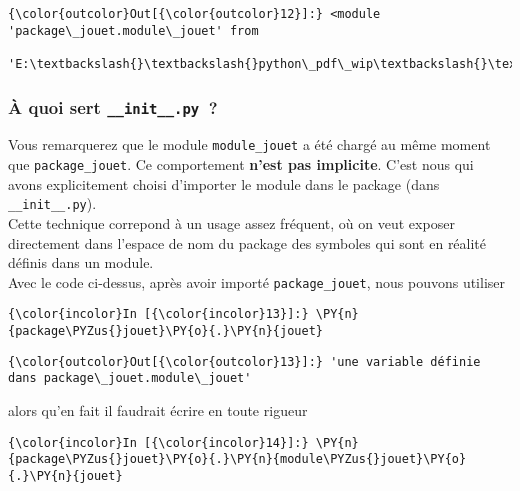 \begin{Verbatim}[commandchars=\\\{\}]
{\color{outcolor}Out[{\color{outcolor}12}]:} <module 'package\_jouet.module\_jouet' from
         'E:\textbackslash{}\textbackslash{}python\_pdf\_wip\textbackslash{}\textbackslash{}flotpython\textbackslash{}\textbackslash{}w5\textbackslash{}\textbackslash{}package\_jouet\textbackslash{}\textbackslash{}module\_jouet.py'>
\end{Verbatim}
            
    \hypertarget{uxe0-quoi-sert-__init__.py}{%
\subsubsection{\texorpdfstring{À quoi sert
\texttt{\_\_init\_\_.py}~?}{À quoi sert \_\_init\_\_.py~?}}\label{uxe0-quoi-sert-__init__.py}}

    Vous remarquerez que le module \texttt{module\_jouet} a été chargé au
même moment que \texttt{package\_jouet}. Ce comportement \textbf{n'est
pas implicite}. C'est nous qui avons explicitement choisi d'importer le
module dans le package (dans \texttt{\_\_init\_\_.py}).\\

    Cette technique correpond à un usage assez fréquent, où on veut exposer
directement dans l'espace de nom du package des symboles qui sont en
réalité définis dans un module.\\

Avec le code ci-dessus, après avoir importé \texttt{package\_jouet},
nous pouvons utiliser

    \begin{Verbatim}[commandchars=\\\{\}]
{\color{incolor}In [{\color{incolor}13}]:} \PY{n}{package\PYZus{}jouet}\PY{o}{.}\PY{n}{jouet}
\end{Verbatim}


\begin{Verbatim}[commandchars=\\\{\}]
{\color{outcolor}Out[{\color{outcolor}13}]:} 'une variable définie dans package\_jouet.module\_jouet'
\end{Verbatim}
            
    alors qu'en fait il faudrait écrire en toute rigueur

    \begin{Verbatim}[commandchars=\\\{\}]
{\color{incolor}In [{\color{incolor}14}]:} \PY{n}{package\PYZus{}jouet}\PY{o}{.}\PY{n}{module\PYZus{}jouet}\PY{o}{.}\PY{n}{jouet}
\end{Verbatim}


